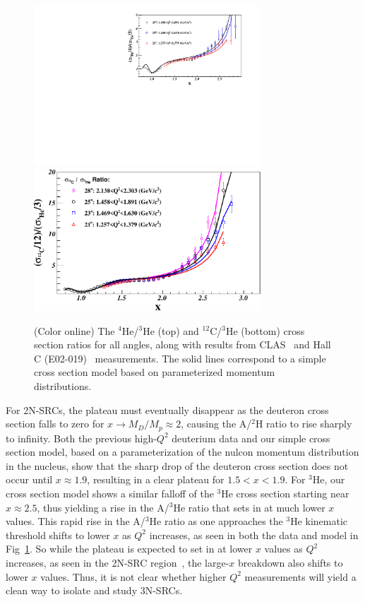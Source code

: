 \documentclass[aps,prl,superscriptaddress,showpacs,twocolumn,floatfix,amsmath,amssymb]{revtex4-1}
\begin{document}
                \begin{figure}[!ht]
		\begin{center}
		  \includegraphics[width=8.5cm,angle=0]{He4_He3_XS_Ratio_MC}
                  \includegraphics[width=8.5cm,angle=0]{C12_He3_XS_Ratio_MC}
		\end{center}
		\vspace*{-5mm}
		\caption{(Color online) The $^4$He/$^3$He (top) and $^{12}$C/$^3$He (bottom) cross section ratios for all angles, 
		  along with results from CLAS~\cite{PhysRevLett.96.082501} and Hall C (E02-019)~\cite{fomin2012} measurements. The solid lines
                  correspond to a simple cross section model based on parameterized momentum distributions.}
		\label{fig:ratios_allqsq}
		\end{figure}

For 2N-SRCs, the plateau must eventually disappear as the deuteron cross section falls to zero for $ x \to
M_D / M_p\approx 2$, causing the A/$^2$H ratio to rise sharply to infinity. Both the previous high-$Q^2$
deuterium data and our simple cross section model, based on a parameterization of the nulcon momentum
distribution in the nucleus, show that the
sharp drop of the deuteron cross section does not occur until $x \approx 1.9$, resulting in a clear plateau
for $1.5 < x < 1.9$. For $^3$He, our cross section model shows a similar falloff of the $^3$He cross section
starting near $x \approx 2.5$, thus yielding a rise in the A/$^3$He ratio that sets in at much lower $x$
values. This rapid rise in the A/$^3$He ratio as one approaches the $^3$He kinematic threshold shifts to
lower $x$ as $Q^2$ increases, as seen in both the data and model in Fig~\ref{fig:ratios_allqsq}. So while
the plateau is expected to set in at lower $x$ values as $Q^2$ increases, as seen in the 2N-SRC
region~\cite{ SLAC_Measurement_PRC.48.2451, PhysRevLett.96.082501}, the large-$x$ breakdown also shifts to
lower $x$ values. Thus, it is not clear whether higher $Q^2$ measurements will yield a clean way to isolate
and study 3N-SRCs.
\end{document}
